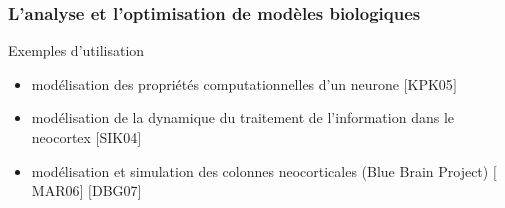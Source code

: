 \documentclass{beamer}
\begin{document}
\begin{frame}
\frametitle{L'analyse et l'optimisation de modèles biologiques}
Exemples d'utilisation
\begin{itemize}
    \item modélisation des propriétés computationnelles d'un neurone $[$KPK05$]$
    \item modélisation de la dynamique du traitement de l'information dans le neocortex $[$SIK04$]$
    \item modélisation et simulation des colonnes neocorticales (Blue Brain Project) $[$MAR06$]$ $[$DBG07$]$
\end{itemize}
\end{frame}




\end{document}
